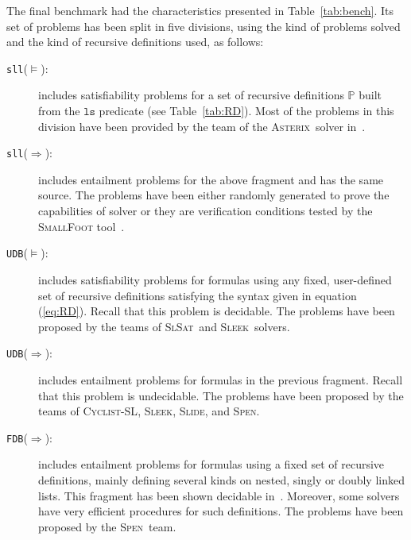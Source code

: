 \documentclass{llncs}
\newcommand{\limp}{\Rightarrow}
\newcommand{\preds}{\mathbb{P}}
\newcommand{\ls}{\mathtt{ls}}
\newcommand{\sllsat}{\texttt{sll}($\models$)}
\newcommand{\sllent}{\texttt{sll}($\limp$)}
\newcommand{\FDBent}{\texttt{FDB}($\limp$)}
\newcommand{\UDBsat}{\texttt{UDB}($\models$)}
\newcommand{\UDBent}{\texttt{UDB}($\limp$)}
\newcommand{\ASTERIX}{\textsc{Asterix}}
\newcommand{\CYCLIST}{\textsc{Cyclist-SL}}
\newcommand{\SLEEK}{\textsc{Sleek}}
\newcommand{\SLIDE}{\textsc{Slide}}
\newcommand{\SLSAT}{\textsc{SlSat}}
\newcommand{\SPEN}{\textsc{Spen}}
\begin{document}
The final benchmark had the characteristics presented in Table~\ref{tab:bench}.
Its set of problems has been split in five divisions, using the kind of problems solved and the kind of recursive definitions used, as follows:
\begin{description}
\item[\sllsat:] includes satisfiability problems for a set of recursive definitions $\preds$ built from the $\ls$ predicate (see Table~\ref{tab:RD}).
Most of the problems in this division have been provided by the team of the \ASTERIX\ solver in~\cite{PerezR11}.

\item[\sllent:] includes entailment problems for the above fragment and has the same source. The problems have been either randomly generated to prove the capabilities of solver or they are verification conditions tested by the \textsc{SmallFoot} tool~\cite{SmallFootsite}.

\item[\UDBsat:] includes satisfiability problems for formulas using any fixed, user-defined set of recursive definitions satisfying the syntax given in equation (\ref{eq:RD}).
Recall that this problem is decidable. 
The problems have been proposed by the teams of \SLSAT\ and \SLEEK\ solvers.

\item[\UDBent:] includes entailment problems for formulas in the previous fragment.
Recall that this problem is undecidable. 
The problems have been proposed by the teams of \CYCLIST, \SLEEK, \SLIDE, and \SPEN.

\item[\FDBent:] includes entailment problems for formulas using a fixed set of recursive definitions, mainly defining several kinds on nested, singly or doubly linked lists. This fragment has been shown decidable in~\cite{AntonopoulosGHKO14,EneaLSV14}.
Moreover, some solvers have very efficient procedures for such definitions.
The problems have been proposed by the \SPEN\ team.
\end{description} 
 
\end{document}
